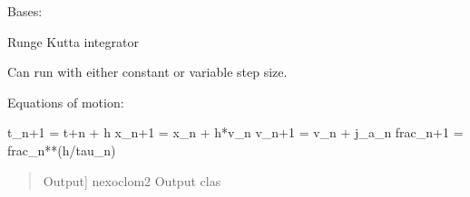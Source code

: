 \documentclass[letterpaper,10pt,english]{sphinxmanual}
\begin{document}

\begin{fulllineitems}
\label{\detokenize{nexoclom2/nexoclom2.particle_tracking.rk5_integrator:nexoclom2.particle_tracking.rk5_integrator.rk5Integrator}}
\pysigstartsignatures
\pysigline
{}
\pysigstopsignatures
\sphinxAtStartPar
Bases: 

\sphinxAtStartPar
Runge Kutta integrator

\sphinxAtStartPar
Can run with either constant or variable step size.

\sphinxAtStartPar
Equations of motion:

\sphinxAtStartPar
t\_n+1 = t+n + h
x\_n+1 = x\_n + h*v\_n
v\_n+1 = v\_n + j\_a\_n
frac\_n+1 = frac\_n**(h/tau\_n)
\begin{quote}\begin{description}
\begin{description}
\sphinxlineitem{\sphinxstylestrong{output}}{[}Output{]}
\sphinxAtStartPar
nexoclom2 Output clas

\end{description}

\begin{description}
\end{description}

\end{description}\end{quote}


\end{fulllineitems}
\end{document}
